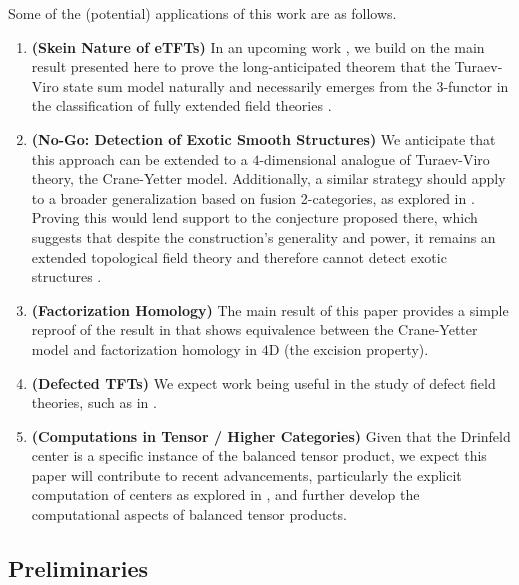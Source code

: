 \noindent Some of the (potential) applications of this work are as follows.

\begin{enumerate}
  \item \textbf{(Skein Nature of eTFTs)} In an upcoming work
        \cite{guu/tv-as-3-functor}, we build on the main result presented here
        to prove the long-anticipated theorem that the Turaev-Viro state sum
        model \cite{viro/turaev-viro-model} naturally and necessarily emerges
        from the 3-functor in the classification of fully extended field
        theories \cite{lurie/tqft} \cite{douglas/dualizable-tensor-categories}.
  \item \textbf{(No-Go: Detection of Exotic Smooth Structures)} We anticipate
        that this approach can be extended to a $4$-dimensional analogue of
        Turaev-Viro theory, the Crane-Yetter model. Additionally, a similar
        strategy should apply to a broader generalization based on fusion
        2-categories, as explored in \cite{douglas/fusion-2-cat-4d-tqft}.
        Proving this would lend support to the conjecture proposed there,
        which suggests that despite the construction's generality and power,
        it remains an extended topological field theory and therefore cannot
        detect exotic structures \cite{reutter/no-go-exotic}.
  \item \textbf{(Factorization Homology)} The main result of this paper
        provides a simple reproof of the result in
        \cite{kirillov/fact-homo-4d-tqft} that shows equivalence between the
        Crane-Yetter model and factorization homology
        \cite{ayala/factorization-homology} in $4$D (the excision property).
  \item \textbf{(Defected TFTs)} We expect work being useful in the study of
        defect field theories, such as in \cite{meusburger/defect-tv}.
  \item \textbf{(Computations in Tensor / Higher Categories)} Given that the
        Drinfeld center is a specific instance of the balanced tensor product,
        we expect this paper will contribute to recent advancements,
        particularly the explicit computation of centers as explored in
        \cite{maurer/computing-center}, and further develop the computational
        aspects of balanced tensor products.
\end{enumerate}



\subsection{Preliminaries}\label{subsection/preliminaries}


